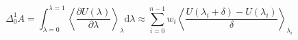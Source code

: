 


\[ \Delta_0^1 A = \int_{\lambda=0}^{\lambda=1} \left< \frac{\partial
    U(\lambda)}{\partial\lambda} \right>_\lambda \mathrm{d}\lambda
\approx \sum_{i=0}^{n-1} w_i \left< \frac{U(\lambda_{i} + \delta) -
    U(\lambda_i)}{\delta} \right>_{\lambda_i} \]


